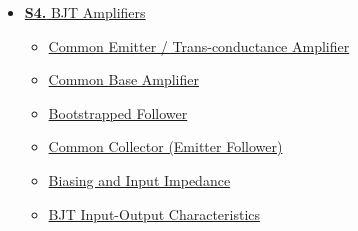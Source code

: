 \documentclass[12pt]{article}
\begin{document}
\begin{tcolorbox}[breakable,colback=cC!5,colframe=cC,boxrule=1pt,arc=5pt,
  left=8pt,right=8pt,top=8pt,bottom=8pt,before skip=4pt]
\begin{itemize}[leftmargin=1.2em,itemsep=1pt,label={\textcolor{cC}{$\triangleright$}}]
\begin{itemize}[leftmargin=1.5em,itemsep=0pt,label={\textcolor{cA}{$\cdot$}}]
        \item \hyperref[sub:s3-switching]{Switching Circuits --- Logic Gates using BJTs}
        \item \hyperref[sub:s3-inverter]{BJT Inverter Analysis}
      \end{itemize}
    \item \hyperref[sec:S4]{\textbf{S4.} BJT Amplifiers}
      \begin{itemize}[leftmargin=1.5em,itemsep=0pt,label={\textcolor{cC}{$\cdot$}}]
        \item \hyperref[sub:s4-ce]{Common Emitter / Trans-conductance Amplifier}
        \item \hyperref[sub:s4-cb]{Common Base Amplifier}
        \item \hyperref[sub:s4-bootstrap]{Bootstrapped Follower}
        \item \hyperref[sub:s4-cc]{Common Collector (Emitter Follower)}
        \item \hyperref[sub:s4-biasimpedance]{Biasing and Input Impedance}
        \item \hyperref[sub:s4-io]{BJT Input-Output Characteristics}
      \end{itemize}

  \end{itemize}
\end{tcolorbox}

\vspace{6pt}
\end{document}
